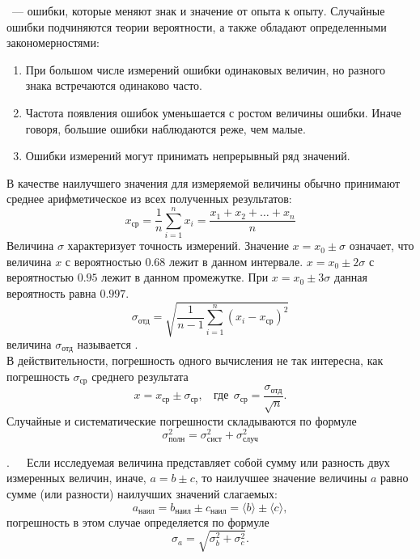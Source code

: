 ~--- ошибки, которые меняют знак и значение от опыта к опыту. Случайные ошибки подчиняются теории вероятности, а также обладают определенными закономерностями:
\begin{enumerate}
	\item
	{При большом числе измерений ошибки одинаковых величин, но разного знака встречаются одинаково часто.}
	\item
	{Частота появления ошибок уменьшается с ростом величины ошибки. Иначе говоря, большие ошибки наблюдаются реже, чем малые.}
	\item
	{Ошибки измерений могут принимать непрерывный ряд значений.}
\end{enumerate}
В качестве наилучшего значения для измеряемой величины обычно принимают среднее арифметическое из всех полученных результатов:
\begin{equation}
	x_\text{ср} = \frac{1}{n}\sum\limits_{i=1}^n x_i = \frac{x_1 + x_2+\ldots + x_n}{n}
\end{equation}
Величина $\sigma$ характеризует точность измерений. Значение $x = x_0 \pm \sigma$ означает, что величина $x$ с вероятностью $0.68$ лежит в данном интервале. $x = x_0 \pm 2\sigma$ с вероятностью $0.95$ лежит в данном промежутке. При $x=x_0 \pm 3\sigma$ данная вероятность равна $0.997$.
\begin{equation}
	\sigma_\text{отд} = \sqrt{\frac{1}{n-1}\sum\limits_{i=1}^n (x_i - x_\text{ср})^2}
\end{equation}
величина $\sigma_\text{отд}$ называется .\\
В действительности, погрешность одного вычисления не так интересна, как погрешность $\sigma_\text{ср}$ среднего результата
\begin{equation}
	x = x_\text{ср} \pm \sigma_\text{ср},~~~~\text{где}~~\sigma_\text{ср} = \frac{\sigma_\text{отд}}{\sqrt{n}}.
\end{equation}
Случайные и систематические погрешности складываются по формуле
\begin{equation}
	\sigma_\text{полн}^2 = \sigma_\text{сист}^2 + \sigma_\text{случ}^2
\end{equation}

.~~~Если исследуемая величина представляет собой сумму или разность двух измеренных величин, иначе, $a = b \pm c$, то наилучшее значение величины $a$ равно сумме (или разности) наилучших значений слагаемых:
\begin{equation}
	a_\text{наил} = b_\text{наил} \pm c_\text{наил} = \langle b \rangle \pm \langle c \rangle,
\end{equation}
погрешность в этом случае определяется по формуле
\begin{equation}
	\sigma_a = \sqrt{\sigma_b^2 + \sigma_c^2}.
\end{equation}

